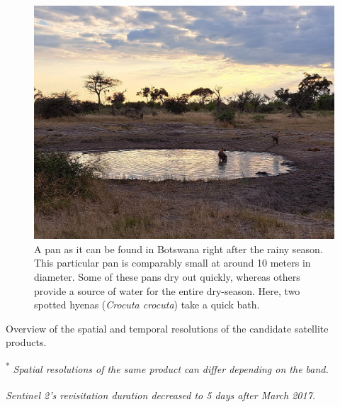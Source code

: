 \documentclass[../FinalThesis.tex]{subfiles}
\begin{document}
\begin{figure}[htpb]
 \begin{center}
  \includegraphics[width = \textwidth]{Figures/Pan}
  \caption{A pan as it can be found in Botswana right after the rainy season.
  This particular pan is comparably small at around 10 meters in diameter. Some
  of these pans dry out quickly, whereas others provide a source of water for
  the entire dry-season. Here, two spotted hyenas (\textit{Crocuta crocuta})
  take a quick bath.}
  \label{Pan}
 \end{center}
\end{figure}

\begin{table}[h]
  \begin{center}
  \caption{Overview of the spatial and temporal resolutions of the candidate satellite products.}
  \label{Satellite}
    \begin{threeparttable}[h]
      
      \begin{tablenotes}
        \item \textsuperscript{*} \textit{Spatial resolutions of the same product can differ depending on the band.}
        \item \textsuperscript{\dag} \textit{Sentinel 2's revisitation duration decreased to 5 days after March 2017.}
      \end{tablenotes}
    \end{threeparttable}
  \end{center}
\end{table}
\end{document}

